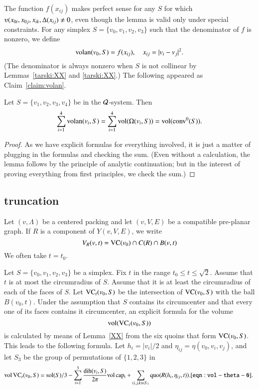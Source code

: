 The function $f(x_{ij})$ makes perfect sense for any $S$ for which $\ups(x_{0i},x_{0j},x_{ik},\Delta(x_{ij})\ne 0$,
even though the lemma is valid only under special constraints.
For any simplex $S=\{v_0,v_1,v_2,v_3\}$ such that the denominator of $f$ is nonzero, we define
$$
{\operatorname{volan}}(v_0,S) = f(x_{ij}),\quad x_{ij} = |v_i-v_j|^2.
$$  
(The denominator is always nonzero when $S$ is not collinear by Lemmas~\ref{tarski:XX} and \ref{tarski:XX}.)
The following appeared as Claim~\ref{claim:volan}.

\begin{lemma}  %
Let $S=\{v_1,v_2,v_3,v_4\}$ be in the ${\mathcal Q}$-system. Then
    $$
    \sum_{i=1}^4 {\operatorname{volan}}(v_i,S) = \sum_{i=1}^4
    {\operatorname{vol}}(\Omega(v_i,S)) = {\operatorname{vol}}({\operatorname{conv}}^0(S)).
    $$
\end{lemma}

\begin{proof} As we have explicit formulas for everything involved,
it is just a matter of plugging in the formulas and checking the sum.
(Even without a calculation, the lemma follows by the principle of analytic continuation;
but in the interest of proving everything from first principles, we
check the sum.)
\end{proof}

\subsection{truncation}

Let $(v,\Lambda)$ be a centered packing and let $(v,V,E)$ be a compatible
pre-planar graph.
If $R$ is a component of $Y(v,V,E)$, we write 
  $$
  V_R(v,t) = {\operatorname{VC}}(v_0)\cap C(R)\cap B(v,t)
  $$
We often
take $t=t_0$.



 Let $S=\{v_0,v_1,v_2,v_3\}$ be a simplex. Fix $t$ in the range
$t_0\le t\le\sqrt2$.  Assume that $t$ is at most the circumradius
of $S$. Assume that it is at least the circumradius of each of the
faces of $S$.  Let ${\operatorname{VC}}_t(v_0,S)$ be the intersection of
${\operatorname{VC}}(v_0,S)$ with the ball $B(v_0,t)$. Under the assumption
that $S$ contains its circumcenter and that every one of its faces
contains it circumcenter, an explicit formula for the volume
$${\operatorname{vol}}({\operatorname{VC}}_t(v_0,S))$$ is calculated by means of
Lemma~\ref{XX} from the six quoins that form ${\operatorname{VC}}(v_0,S)$.
This leads to the
following formula. Let $h_i = |v_i|/2$ and
$\eta_{ij}=\eta(v_0,v_i,v_j)$, and let $S_3$ be the group of
permutations of $\{1,2,3\}$ in
\begin{equation}
   \op{vol}\,\op{VC}_t(v_0,S) =
   \sol(S)/3 - \sum_{i=1}^3 \frac{\dih(v_i,S)}{2\pi}\op{vol}\,\op{cap_i}
   +\sum_{(i,j,k)\in S_3} \quo(R(h_i,\eta_{ij},t)).
   \tlabel{eqn:vol-theta-0}
\end{equation}


